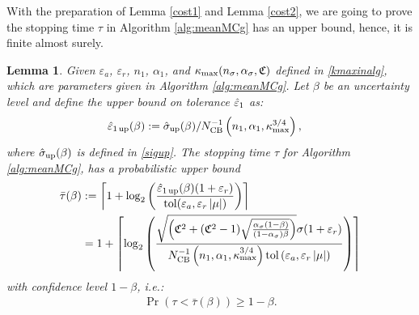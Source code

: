 \documentclass{iitthesis}
\newtheorem{lemma}[theorem]{Lemma}
\theoremstyle{definition}
\begin{document}
With the preparation of Lemma \ref{cost1} and Lemma \ref{cost2}, we are going to prove the stopping time $\tau$ in Algorithm \ref{alg:meanMCg} has an upper bound, hence, it is finite almost surely.
\begin{lemma}\label{tauprobbound}
Given $\varepsilon_a$, $\varepsilon_r$, $n_1$, $\alpha_1$, and $\kappa_{\max}(n_\sigma, \alpha_\sigma, \mathfrak{C})$ defined in \eqref{kmaxinalg}, which are parameters given in Algorithm \ref{alg:meanMCg}. Let $\beta$ be an uncertainty level and define the upper bound on tolerance $\hat{\varepsilon}_1$ as:
\begin{align}\label{eps1updef}
\hat{\varepsilon}_{1\operatorname{up}}(\beta)&:=\hat{\sigma}_{\operatorname{up}}(\beta)/N_{\text{CB}}^{-1}\left(n_1,\alpha_1,\kappa_{\max}^{3/4}\right),
\end{align}
where $\hat{\sigma}_{\operatorname{up}}(\beta)$ is defined in \eqref{sigup}. The stopping time $\tau$ for Algorithm \ref{alg:meanMCg}, has a probabilistic upper bound
\begin{align}
\bar{\tau}(\beta)&:= \left \lceil 1+\log_2 \left(\frac{\hat{\varepsilon}_{1\operatorname{up}}(\beta)(1+\varepsilon_r)}{ \operatorname{tol}(\varepsilon_a,\varepsilon_r \left \lvert \mu \right \rvert)}\right) \right \rceil \label{taubardef} \\
&=1+\left \lceil \log_2 \left(\frac{\sqrt{\left(\mathfrak{C}^2+(\mathfrak{C}^2-1)\sqrt{\frac{\alpha_{\sigma}(1-\beta)}{(1-\alpha_{\sigma})\beta}}\right)}\sigma(1+\varepsilon_r)}{ N_{\text{CB}}^{-1}\left(n_1,\alpha_1,\kappa_{\max}^{3/4}\right)\operatorname{tol}\left(\varepsilon_a,\varepsilon_r \left \lvert \mu \right \rvert\right)}\right)\right \rceil \label{taubarexplicitdef}
\end{align}
with confidence level $1-\beta$, i.e.:
\begin{align}\label{ineq:taufinite}
\Pr(\tau <\bar{\tau}(\beta)) \geq 1-\beta.
\end{align}
\end{lemma}
\end{document}

